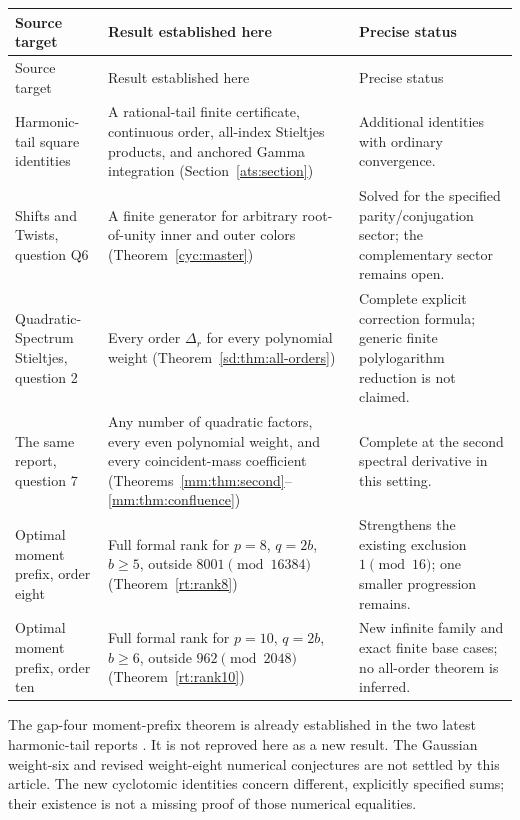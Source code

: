 \begin{longtable}{@{}>{\raggedright\arraybackslash}p{}>{\raggedright\arraybackslash}p{}>{\raggedright\arraybackslash}p{}@{}}
\toprule
Source target & Result established here & Precise status\\
\midrule
\endfirsthead
\toprule Source target & Result established here & Precise status\\\midrule
\endhead
Harmonic-tail square identities & A rational-tail finite certificate,
continuous order, all-index Stieltjes products, and anchored Gamma
integration (Section~\ref{ats:section}) & Additional identities with
ordinary convergence.\\[5pt]
Shifts and Twists, question Q6 \cite{HTST} & A finite generator for
arbitrary root-of-unity inner and outer colors
(Theorem~\ref{cyc:master}) & Solved for the specified parity/conjugation
sector; the complementary sector remains open.\\[5pt]
Quadratic-Spectrum Stieltjes, question 2 \cite{QSpec} & Every order
$\Delta_r$ for every polynomial weight
(Theorem~\ref{sd:thm:all-orders}) & Complete explicit correction formula;
generic finite polylogarithm reduction is not claimed.\\[5pt]
The same report, question 7 & Any number of quadratic factors, every
even polynomial weight, and every coincident-mass coefficient
(Theorems~\ref{mm:thm:second}--\ref{mm:thm:confluence}) & Complete at the
second spectral derivative in this setting.\\[5pt]
Optimal moment prefix, order eight \cite{PRR} & Full formal rank for
$p=8$, $q=2b$, $b\ge5$, outside $8001\pmod{16384}$
(Theorem~\ref{rt:rank8}) & Strengthens the existing exclusion
$1\pmod{16}$; one smaller progression remains.\\[5pt]
Optimal moment prefix, order ten & Full formal rank for $p=10$,
$q=2b$, $b\ge6$, outside $962\pmod{2048}$
(Theorem~\ref{rt:rank10}) & New infinite family and exact finite base
cases; no all-order theorem is inferred.\\
\bottomrule
\end{longtable}

The gap-four moment-prefix theorem is already established in the two
latest harmonic-tail reports \cite{HTGC,HTST}. It is not reproved here
as a new result. The Gaussian weight-six and revised weight-eight
numerical conjectures are not settled by this article. The new
cyclotomic identities concern different, explicitly specified sums;
their existence is not a missing proof of those numerical equalities.

